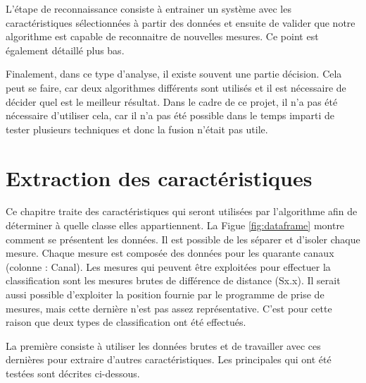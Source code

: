 L'étape de reconnaissance consiste à entrainer un système avec les caractéristiques sélectionnées à partir des données et ensuite de valider que notre algorithme est capable de reconnaitre de nouvelles mesures. Ce point est également détaillé plus bas. 

Finalement, dans ce type d'analyse, il existe souvent une partie décision. Cela peut se faire, car deux algorithmes différents sont utilisés et il est nécessaire de décider quel est le meilleur résultat. Dans le cadre de ce projet, il n'a pas été nécessaire d'utiliser cela, car il n'a pas été possible dans le temps imparti de tester plusieurs techniques et donc la fusion n'était pas utile.

\section{Extraction des caractéristiques}
Ce chapitre traite des caractéristiques qui seront utilisées par l'algorithme afin de déterminer à quelle classe elles appartiennent. La Figue \ref{fig:dataframe} montre comment se présentent les données. Il est possible de les séparer et d'isoler chaque mesure. Chaque mesure est composée des données pour les quarante canaux (colonne : Canal). Les mesures qui peuvent être exploitées pour effectuer la classification sont les mesures brutes de différence de distance (Sx.x). Il serait aussi possible d'exploiter la position fournie par le programme de prise de mesures, mais cette dernière n'est pas assez représentative. C'est pour cette raison que deux types de classification ont été effectués. 

La première consiste à utiliser les données brutes et de travailler avec ces dernières pour extraire d'autres caractéristiques. Les principales qui ont été testées sont décrites ci-dessous.

